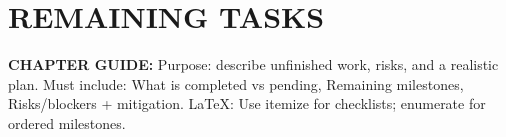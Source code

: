 \chapter{REMAINING TASKS}

\noindent\textbf{CHAPTER GUIDE:} Purpose: describe unfinished work, risks, and a realistic plan. Must include: What is completed vs pending, Remaining milestones, Risks/blockers + mitigation. LaTeX: Use itemize for checklists; enumerate for ordered milestones.
